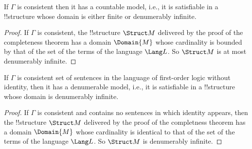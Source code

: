\documentclass[../../include/open-logic-section]{subfiles}
\begin{document}

\begin{thm} 
If $\Gamma$ is consistent then it has a countable model, i.e., it is
satisfiable in a !!{structure} whose domain is either finite or
denumerably infinite.
\end{thm}

\begin{proof}
  If $\Gamma$ is consistent, the !!{structure} $\Struct M$ delivered by
  the proof of the completeness theorem has a domain $\Domain{M}$ whose
  cardinality is bounded by that of the set of the terms of the
  language $\Lang L$. So $\Struct M$ is at most denumerably infinite.
\end{proof}

\begin{thm} 
If $\Gamma$ is consistent set of sentences in the language of first-order logic without identity, then it has a denumerable model, i.e., it is
satisfiable in a !!{structure} whose domain is denumerably infinite.
\end{thm}

\begin{proof}
  If $\Gamma$ is consistent and contains no sentences in which identity appears, then the !!{structure} $\Struct M$ delivered by
  the proof of the completness theorem has a domain $\Domain{M}$ whose
  cardinality is identical to that of the set of the terms of the
  language $\Lang L$. So $\Struct M$ is denumerably infinite.
\end{proof}
\end{document}
